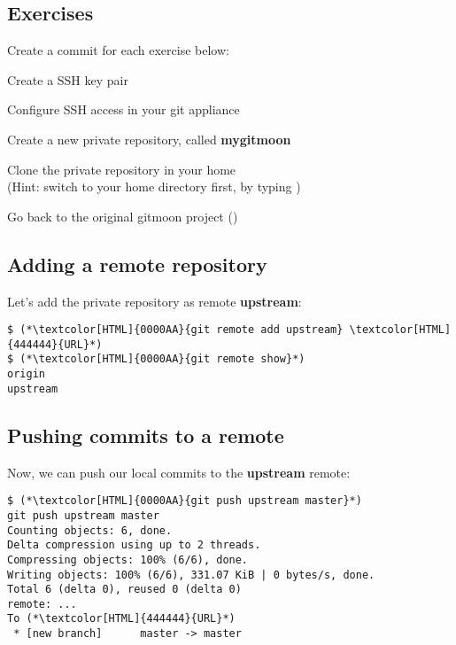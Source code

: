 \subsection{Exercises}
\begin{frame}[fragile]
  \subslidetitle
  Create a commit for each exercise below:
  \begin{exercise}
    \item Create a SSH key pair
    \item Configure SSH access in your git appliance
    \item Create a new private repository, called \textbf{mygitmoon}
    \item Clone the private repository in your home \\
      (Hint: switch to your home directory first, by typing )
    \item Go back to the original gitmoon project ()
  \end{exercise}
\end{frame}

\subsection{Adding a remote repository}
\begin{frame}[fragile]
  \subslidetitle
  Let's add the private repository as remote \textbf{upstream}:
  \begin{lstlisting}
$ (*\textcolor[HTML]{0000AA}{git remote add upstream} \textcolor[HTML]{444444}{URL}*)
$ (*\textcolor[HTML]{0000AA}{git remote show}*)
origin
upstream
\end{lstlisting}
\end{frame}

\subsection{Pushing commits to a remote}
\begin{frame}[fragile]
  \subslidetitle
  Now, we can push our local commits to the \textbf{upstream} remote:
  \begin{lstlisting}
$ (*\textcolor[HTML]{0000AA}{git push upstream master}*)
git push upstream master
Counting objects: 6, done.
Delta compression using up to 2 threads.
Compressing objects: 100% (6/6), done.
Writing objects: 100% (6/6), 331.07 KiB | 0 bytes/s, done.
Total 6 (delta 0), reused 0 (delta 0)
remote: ...
To (*\textcolor[HTML]{444444}{URL}*)
 * [new branch]      master -> master
\end{lstlisting}
\end{frame}

